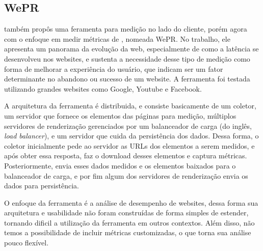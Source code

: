 \documentclass[12pt]{tcc}
\begin{document}
		\subsection{WePR}
		\par \citep{Asrese2019MeasuringWL} também propôs uma feramenta para medição no lado do cliente, porém agora com o enfoque em medir métricas de , nomeada WePR. No trabalho, ele apresenta um panorama da evolução da web, especialmente de como a latência se desenvolveu nos websites, e sustenta a necessidade desse tipo de medição como forma de melhorar a experiência do usuário, que indicam ser um fator determinante no abandono ou sucesso de um website. A ferramenta foi testada utilizando grandes websites como Google, Youtube e Facebook. 
		\par A arquitetura da ferramenta é distribuida, e consiste basicamente de um coletor, um servidor que fornece os elementos das páginas para medição, múltiplos servidores de renderização gerenciados por um balanceador de carga (do inglês, \emph{load balancer}), e um servidor que cuida da persistência dos dados. Dessa forma, o coletor inicialmente pede ao servidor as URLs dos elementos a serem medidos, e após obter essa resposta, faz o download desses elementos e captura métricas. Posteriormente, envia esses dados medidos e os elementos baixados para o balanceador de carga, e por fim algum dos servidores de renderização envia os dados para persistência.
		\par O enfoque da ferramenta é a análise de desempenho de websites, dessa forma sua arquitetura e usabilidade não foram construídas de forma simples de estender, tornando dificil a utilização da ferramenta em outros contextos. Além disso, não temos a possibilidade de incluir métricas customizadas, o que torna sua análise pouco flexível.
		
\end{document}
